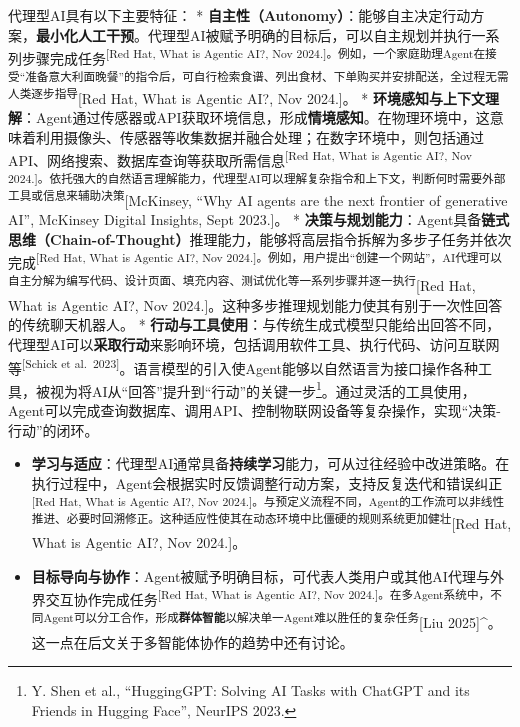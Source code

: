 \documentclass[
  letterpaper,
]{scrbook}
\begin{document}
代理型AI具有以下主要特征： *
\textbf{自主性（Autonomy）}：能够自主决定行动方案，\textbf{最小化人工干预}。代理型AI被赋予明确的目标后，可以自主规划并执行一系列步骤完成任务\textsuperscript{{[}Red
Hat, What is Agentic AI?, Nov
2024.{]}。例如，一个家庭助理Agent在接受``准备意大利面晚餐''的指令后，可自行检索食谱、列出食材、下单购买并安排配送，全过程无需人类逐步指导}{[}Red
Hat, What is Agentic AI?, Nov 2024.{]}。 *
\textbf{环境感知与上下文理解}：Agent通过传感器或API获取环境信息，形成\textbf{情境感知}。在物理环境中，这意味着利用摄像头、传感器等收集数据并融合处理；在数字环境中，则包括通过API、网络搜索、数据库查询等获取所需信息\textsuperscript{{[}Red
Hat, What is Agentic AI?, Nov
2024.{]}。依托强大的自然语言理解能力，代理型AI可以理解复杂指令和上下文，判断何时需要外部工具或信息来辅助决策}{[}McKinsey,
``Why AI agents are the next frontier of generative AI'', McKinsey
Digital Insights, Sept 2023.{]}。 *
\textbf{决策与规划能力}：Agent具备\textbf{链式思维（Chain-of-Thought）}推理能力，能够将高层指令拆解为多步子任务并依次完成\textsuperscript{{[}Red
Hat, What is Agentic AI?, Nov
2024.{]}。例如，用户提出``创建一个网站''，AI代理可以自主分解为编写代码、设计页面、填充内容、测试优化等一系列步骤并逐一执行}{[}Red
Hat, What is Agentic AI?, Nov
2024.{]}。这种多步推理规划能力使其有别于一次性回答的传统聊天机器人。 *
\textbf{行动与工具使用}：与传统生成式模型只能给出回答不同，代理型AI可以\textbf{采取行动}来影响环境，包括调用软件工具、执行代码、访问互联网等\textsuperscript{{[}Schick
et
al.~2023{]}}。语言模型的引入使Agent能够以自然语言为接口操作各种工具，被视为将AI从``回答''提升到``行动''的关键一步\footnote{Y.
  Shen et al., ``HuggingGPT: Solving AI Tasks with ChatGPT and its
  Friends in Hugging Face'', NeurIPS 2023.}。通过灵活的工具使用，Agent可以完成查询数据库、调用API、控制物联网设备等复杂操作，实现``决策-行动''的闭环。

\begin{itemize}
\item
  \textbf{学习与适应}：代理型AI通常具备\textbf{持续学习}能力，可从过往经验中改进策略。在执行过程中，Agent会根据实时反馈调整行动方案，支持反复迭代和错误纠正\textsuperscript{{[}Red
  Hat, What is Agentic AI?, Nov
  2024.{]}。与预定义流程不同，Agent的工作流可以非线性推进、必要时回溯修正。这种适应性使其在动态环境中比僵硬的规则系统更加健壮}{[}Red
  Hat, What is Agentic AI?, Nov 2024.{]}。
\item
  \textbf{目标导向与协作}：Agent被赋予明确目标，可代表人类用户或其他AI代理与外界交互协作完成任务\textsuperscript{{[}Red
  Hat, What is Agentic AI?, Nov
  2024.{]}。在多Agent系统中，不同Agent可以分工合作，形成\textbf{群体智能}以解决单一Agent难以胜任的复杂任务}{[}Liu
  2025{]}\^{}。这一点在后文关于多智能体协作的趋势中还有讨论。
\end{itemize}
\end{document}
